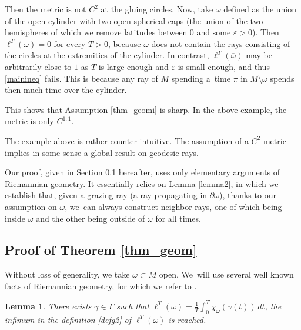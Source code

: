 \documentclass[JEP,XML,SOM,Unicode, NoEqCountersInSection,NoFloatCountersInSection,published]{cedram}
\newtheorem{lemma}{Lemma}
\theoremstyle{definition}
\begin{document}
\begin{itemize}
Then the metric is not $C^2$ at the gluing circles. Now, take $\omega$ defined as the union of the open cylinder with two open spherical caps (\ie the union of the two hemispheres of which we remove latitudes between $0$ and some $\varepsilon>0$). Then $\ell^T(\omega)=0$ for every $T>0$, because $\omega$ does not contain the rays consisting of the circles at the extremities of the cylinder. In contrast, $\ell^T(\overline\omega)$ may be arbitrarily close to $1$ as $T$ is large enough and $\varepsilon$ is small enough, and thus \eqref{mainineq} fails. This is because any ray of $M$ spending a~time $\pi$ in $M\setminus\omega$ spends then much time over the cylinder.

This shows that Assumption \eqref{thm_geomi} is sharp. In the above example, the metric is only $C^{1,1}$.

The example above is rather counter-intuitive. The assumption of a $C^2$ metric implies in some sense a global result on geodesic rays.
\end{itemize}

Our proof, given in Section \ref{sec_proof_thm_geom} hereafter, uses only elementary arguments of Riemannian geometry. It essentially relies on Lemma \ref{lemma2}, in which we establish that, given a grazing ray (\ie a ray propagating in $\partial\omega$), thanks to our assumption on $\omega$, we~can always construct neighbor rays, one of which being inside $\omega$ and the other being outside of $\omega$ for all times.

\subsection{Proof of Theorem \ref{thm_geom}}\label{sec_proof_thm_geom}
Without loss of generality, we take $\omega\subset M$ open.
We~will use several well known facts of Riemannian geometry, for which we refer to \cite{Berger}.

\begin{lemma}\label{lemma1}
There exists $\gamma\in\Gamma$ such that $\ell^T(\omega) = \frac{1}{T}\int_0^T\chi_\omega(\gamma(t))\, dt$, \ie the infimum in the definition \eqref{defg2} of $\ell^T(\omega)$ is reached.
\end{lemma}
\end{document}
